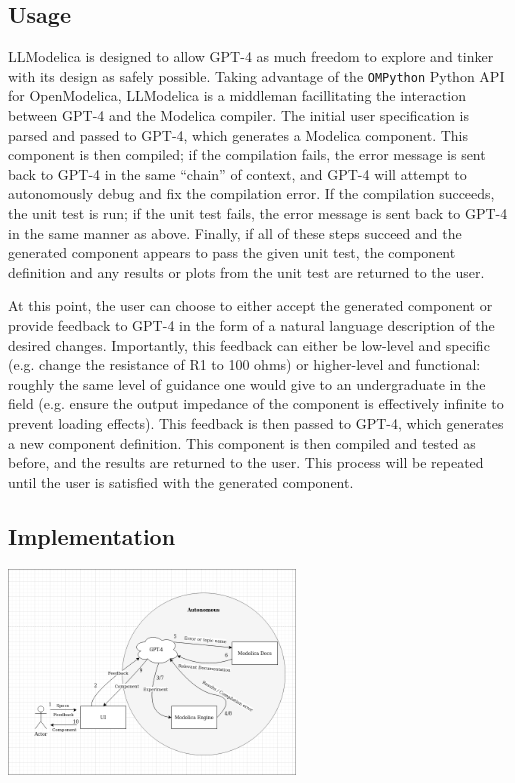 \documentclass[11pt]{article}
\begin{document}
\subsection{Usage}
\label{sec:org3eba5ba}
LLModelica is designed to allow GPT-4 as much freedom to explore and tinker with its design as safely possible. Taking advantage of the \texttt{OMPython} Python API for OpenModelica, LLModelica is a middleman facillitating the interaction between GPT-4 and the Modelica compiler. The initial user specification is parsed and passed to GPT-4, which generates a Modelica component. This component is then compiled; if the compilation fails, the error message is sent back to GPT-4 in the same ``chain'' of context, and GPT-4 will attempt to autonomously debug and fix the compilation error. If the compilation succeeds, the unit test is run; if the unit test fails, the error message is sent back to GPT-4 in the same manner as above. Finally, if all of these steps succeed and the generated component appears to pass the given unit test, the component definition and any results or plots from the unit test are returned to the user.

At this point, the user can choose to either accept the generated component or provide feedback to GPT-4 in the form of a natural language description of the desired changes. Importantly, this feedback can either be low-level and specific (e.g. change the resistance of R1 to 100 ohms) or higher-level and functional: roughly the same level of guidance one would give to an undergraduate in the field (e.g. ensure the output impedance of the component is effectively infinite to prevent loading effects). This feedback is then passed to GPT-4, which generates a new component definition. This component is then compiled and tested as before, and the results are returned to the user. This process will be repeated until the user is satisfied with the generated component.

\subsection{Implementation}
\label{sec:org804c71b}
\begin{center}
\includegraphics[width=3in]{./images/diagram.png}
\end{center}
\end{document}
